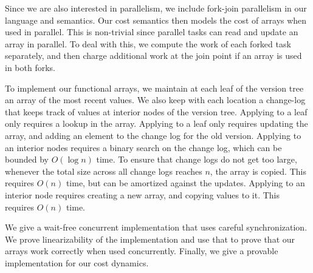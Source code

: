 Since we are also interested in parallelism, we include fork-join
parallelism in our language and semantics.    Our cost semantics then
models the cost of arrays when used in parallel.  This is non-trivial
since parallel tasks can read and update an array in parallel.
To deal with this, we compute the work of each forked task separately,
and then charge additional work at the join point if an array is used
in both forks.

To implement our functional arrays, we maintain at each leaf of the
version tree an array of the most recent values.  We also keep with
each location a change-log that keeps track of values at interior
nodes of the version tree.  Applying \get{} to a leaf only requires a
lookup in the array.  Applying \set{} to a leaf only requires updating
the array, and adding an element to the change log for the old
version.  Applying \get{} to an interior nodes requires a binary
search on the change log, which can be bounded by $O(\log n)$ time.
To ensure that change logs do not get too large, whenever the total
size across all change logs reaches $n$, the array is copied.   This
requires $O(n)$ time, but can be amortized against the updates.
Applying \set{} to an interior node requires creating a new array,
and copying values to it.   This requires $O(n)$ time.    

We give a wait-free concurrent implementation that uses careful
synchronization. We prove linearizability of the implementation and
use that to prove that our arrays work correctly when used
concurrently. Finally, we give a provable implementation for our cost
dynamics.
